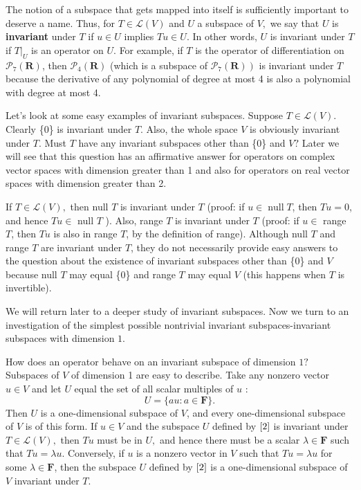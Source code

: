 \documentclass[12pt]{book}
\theoremstyle{definition}\newtheorem{dfn}{Définition}[chapter]
\theoremstyle{plain}\newtheorem{thm}{Théorème}[chapter]
\theoremstyle{plain}\newtheorem{prp}{Proposition}[chapter]
\theoremstyle{plain}\newtheorem{lem}{\bf Lemme}[chapter]
\theoremstyle{plain}\newtheorem{axm}{\bf Axiome}[chapter]
\theoremstyle{plain}\newtheorem{lmm}{\bf Lemme}[chapter]
\theoremstyle{plain}\newtheorem{exm}{\bf Example}[chapter]
\theoremstyle{plain}\newtheorem{cor}{\bf Corollaire}[chapter]
\theoremstyle{remark}\newtheorem{rem}{Remarque}[chapter]
\begin{document}
The notion of a subspace that gets mapped into itself is sufficiently important to deserve a name. Thus, for $T \in \mathcal{L}(V)$ and $U$ a subspace of $V,$ we say that $U$ is \textbf{invariant} under $T$ if $u \in U$ implies $T u \in U$. In other words, $U$ is invariant under $T$ if $\left.T\right|_{U}$ is an operator on $U$. For example, if $T$ is the operator of differentiation on $\mathcal{P}_{7}(\mathbf{R})$, then $\mathcal{P}_{4}(\mathbf{R})$ (which is a subspace of $\left.\mathcal{P}_{7}(\mathbf{R})\right)$ is invariant under $T$ because the derivative of any polynomial of degree at most 4 is also a polynomial with degree at most 4.

Let's look at some easy examples of invariant subspaces. Suppose $T \in \mathcal{L}(V)$. Clearly \{0\} is invariant under $T$. Also, the whole space $V$ is obviously invariant under $T$. Must $T$ have any invariant subspaces other than \{0\} and $V ?$ Later we will see that this question has an affirmative answer for operators on complex vector spaces with dimension greater than 1 and also for operators on real vector spaces with dimension greater than 2.

If $T \in \mathcal{L}(V),$ then null $T$ is invariant under $T$ (proof: if $u \in \operatorname{null} T$, then $T u=0$, and hence $T u \in$ null $T$ ). Also, range $T$ is invariant under $T$ (proof: if $u \in$ range $T$, then $T u$ is also in range $T$, by the definition of range). Although null $T$ and range $T$ are invariant under $T$, they do not necessarily provide easy answers to the question about the existence of invariant subspaces other than \{0\} and $V$ because null $T$ may equal \{0\} and range $T$ may equal $V$ (this happens when $T$ is invertible).

We will return later to a deeper study of invariant subspaces. Now we turn to an investigation of the simplest possible nontrivial invariant subspaces-invariant subspaces with dimension $1 .$

How does an operator behave on an invariant subspace of dimension $1 ?$ Subspaces of $V$ of dimension 1 are easy to describe. Take any nonzero vector $u \in V$ and let $U$ equal the set of all scalar multiples of $u$ :
\begin{equation}
U=\{a u: a \in \mathbf{F}\}\label{2} .
\end{equation}
Then $U$ is a one-dimensional subspace of $V$, and every one-dimensional subspace of $V$ is of this form. If $u \in V$ and the subspace $U$ defined by $\ref{2}$ is invariant under $T \in \mathcal{L}(V),$ then $T u$ must be in $U,$ and hence there must be a scalar $\lambda \in \mathbf{F}$ such that $T u=\lambda u .$ Conversely, if $u$ is a nonzero vector in $V$ such that $T u=\lambda u$ for some $\lambda \in \mathbf{F}$, then the subspace $U$ defined by $\ref{2}$ is a one-dimensional subspace of $V$ invariant under $T$.
\end{document}
